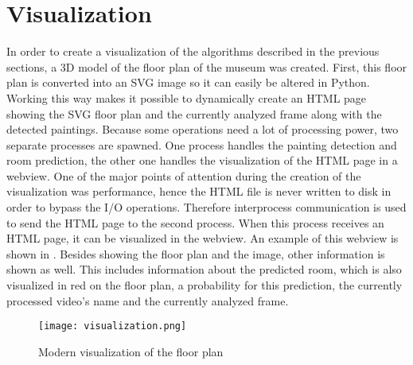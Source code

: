 \section{Visualization}

In order to create a visualization of the algorithms described in the previous sections, a 3D model of the floor plan of the museum was created. First, this floor plan is converted into an SVG image so it can easily be altered in Python. Working this way makes it possible to dynamically create an HTML page showing the SVG floor plan and the currently analyzed frame along with the detected paintings. Because some operations need a lot of processing power, two separate processes are spawned. One process handles the painting detection and room prediction, the other one handles the visualization of the HTML page in a webview. One of the major points of attention during the creation of the visualization was performance, hence the HTML file is never written to disk in order to bypass the I/O operations. Therefore interprocess communication is used to send the HTML page to the second process. When this process receives an HTML page, it can be visualized in the webview. An example of this webview is shown in . Besides showing the floor plan and the image, other information is shown as well. This includes information about the predicted room, which is also visualized in red on the floor plan, a probability for this prediction, the currently processed video's name and the currently analyzed frame.

\begin{figure}
    \centering
    \texttt{[image: visualization.png]}
    \label{fig:webview}
    \caption{Modern visualization of the floor plan}
\end{figure}
